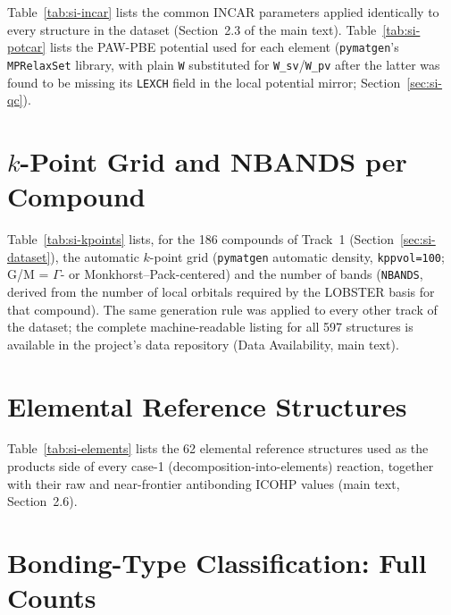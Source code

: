 \documentclass[11pt]{article}
\begin{document}
Table~\ref{tab:si-incar} lists the common INCAR parameters applied
identically to every structure in the dataset (Section~2.3 of the main
text). Table~\ref{tab:si-potcar} lists the PAW-PBE potential used for each
element (\texttt{pymatgen}'s \texttt{MPRelaxSet} library, with plain
\texttt{W} substituted for \texttt{W\_sv}/\texttt{W\_pv} after the latter was
found to be missing its \texttt{LEXCH} field in the local potential mirror;
Section~\ref{sec:si-qc}).

\begin{table}[htbp]
\centering
\caption{Common VASP INCAR parameters.}
\label{tab:si-incar}

\end{table}

{\small

}

\section{$k$-Point Grid and NBANDS per Compound}
\label{sec:si-kpoints}

Table~\ref{tab:si-kpoints} lists, for the 186 compounds of Track~1
(Section~\ref{sec:si-dataset}), the automatic $k$-point grid
(\texttt{pymatgen} automatic density, \texttt{kppvol=100}; G/M = $\Gamma$-
or Monkhorst--Pack-centered) and the number of bands (\texttt{NBANDS},
derived from the number of local orbitals required by the LOBSTER basis for
that compound). The same generation rule was applied to every other track
of the dataset; the complete machine-readable listing for all 597
structures is available in the project's data repository (Data
Availability, main text).

{\small

}

\section{Elemental Reference Structures}
\label{sec:si-elements}

Table~\ref{tab:si-elements} lists the 62 elemental reference structures used
as the products side of every case-1 (decomposition-into-elements)
reaction, together with their raw and near-frontier antibonding ICOHP
values (main text, Section~2.6).

{\small

}

\section{Bonding-Type Classification: Full Counts}
\label{sec:si-bondtype}
\end{document}
